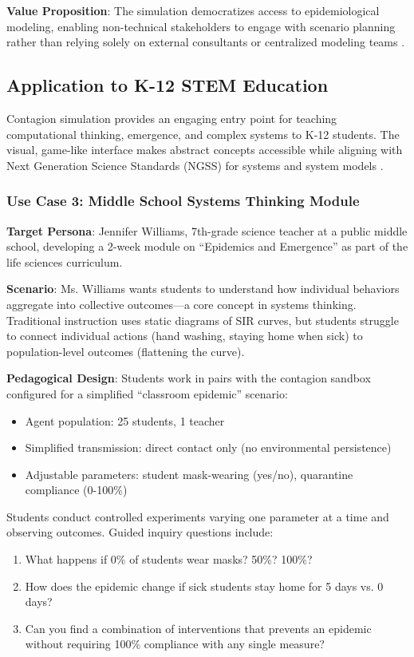 \textbf{Value Proposition}: The simulation democratizes access to epidemiological modeling, enabling non-technical stakeholders to engage with scenario planning rather than relying solely on external consultants or centralized modeling teams \cite{halpern2020representing}.

\subsection{Application to K-12 STEM Education}

Contagion simulation provides an engaging entry point for teaching computational thinking, emergence, and complex systems to K-12 students. The visual, game-like interface makes abstract concepts accessible while aligning with Next Generation Science Standards (NGSS) for systems and system models \cite{ngss2013next}.

\subsubsection{Use Case 3: Middle School Systems Thinking Module}

\textbf{Target Persona}: Jennifer Williams, 7th-grade science teacher at a public middle school, developing a 2-week module on ``Epidemics and Emergence'' as part of the life sciences curriculum.

\textbf{Scenario}: Ms. Williams wants students to understand how individual behaviors aggregate into collective outcomes---a core concept in systems thinking. Traditional instruction uses static diagrams of SIR curves, but students struggle to connect individual actions (hand washing, staying home when sick) to population-level outcomes (flattening the curve).

\textbf{Pedagogical Design}: Students work in pairs with the contagion sandbox configured for a simplified ``classroom epidemic'' scenario:
\begin{itemize}
    \item Agent population: 25 students, 1 teacher
    \item Simplified transmission: direct contact only (no environmental persistence)
    \item Adjustable parameters: student mask-wearing (yes/no), quarantine compliance (0-100\%)
\end{itemize}

Students conduct controlled experiments varying one parameter at a time and observing outcomes. Guided inquiry questions include:
\begin{enumerate}
    \item What happens if 0\% of students wear masks? 50\%? 100\%?
    \item How does the epidemic change if sick students stay home for 5 days vs. 0 days?
    \item Can you find a combination of interventions that prevents an epidemic without requiring 100\% compliance with any single measure?
\end{enumerate}

